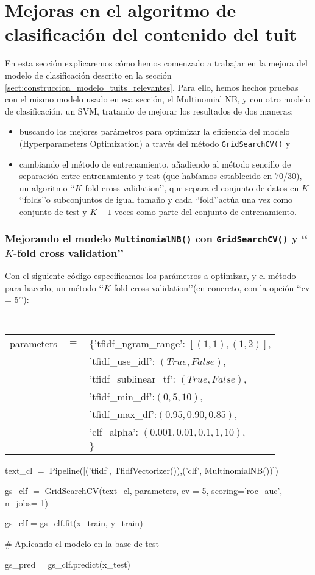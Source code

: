 \section{Mejoras en el algoritmo de clasificación del contenido del tuit}
\label{sect:mejoras_alg_clasificacion_tuit}
En esta sección explicaremos cómo hemos comenzado a trabajar en la mejora del modelo de clasificación descrito en la sección \ref{sect:construccion_modelo_tuits_relevantes}.
Para ello, hemos hechos pruebas con el mismo modelo usado en esa sección, el Multinomial NB, y con otro modelo de clasificación, un SVM, tratando de mejorar los resultados de dos maneras:
\begin{itemize}
\item buscando los mejores parámetros para optimizar la eficiencia del modelo 
(Hyperparameters Optimization) a través del método {\tt GridSearchCV()} y 
\item cambiando el método de entrenamiento, añadiendo al
método sencillo de separación entre entrenamiento y test (que habíamos establecido en $70/30$), 
un algoritmo \lq\lq $K$-fold cross validation\rq\rq, que separa el conjunto de datos en $K$ 
\lq\lq folds\rq\rq o subconjuntos de igual tamaño y cada \lq\lq fold\rq\rq actúa una vez como 
conjunto de test y $K-1$ veces como parte del conjunto de entrenamiento.
\end{itemize}

\subsubsection{Mejorando el modelo {\tt MultinomialNB()} con {\tt GridSearchCV()}
y \lq\lq $K$-fold cross validation\rq\rq}

Con el siguiente código especificamos los parámetros a optimizar, y el método para hacerlo,
un método \lq\lq $K$-fold cross validation\rq\rq (en concreto, con la opción \lq\lq cv = 5\rq\rq):

\medskip

{\tt
\noindent\begin{tabular}{rcl}
parameters &$=$& $\{$'tfidf\_ngram\_range': $[(1,1),(1,2)]$,\\
              &&'tfidf\_use\_idf': $(True, False)$,\\
              &&'tfidf\_sublinear\_tf': $(True, False)$,\\
              &&'tfidf\_min\_df':$(0, 5, 10)$,\\
              &&'tfidf\_max\_df':$(0.95, 0.90, 0.85)$,\\
              &&'clf\_alpha': $(0.001, 0.01, 0.1, 1,10),$\\
			  &&$\}$
\end{tabular}

\noindent text\_cl $=$ Pipeline([('tfidf', TfidfVectorizer()),('clf', MultinomialNB())])

\noindent gs\_clf $=$ GridSearchCV(text\_cl, parameters, cv = 5, scoring='roc\_auc', n\_jobs=-1)

\noindent gs\_clf = gs\_clf.fit(x\_train, y\_train)
    
\noindent\# Aplicando el modelo en la base de test

\noindent gs\_pred = gs\_clf.predict(x\_test)

}


